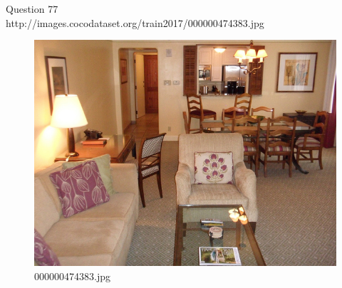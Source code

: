 Question 77\\
http://images.cocodataset.org/train2017/000000474383.jpg
\begin{figure}[h]
    \centering
    \includegraphics[width=0.8\linewidth]{../image set/hard/000000474383.jpg}
    \caption{000000474383.jpg}
\end{figure}
